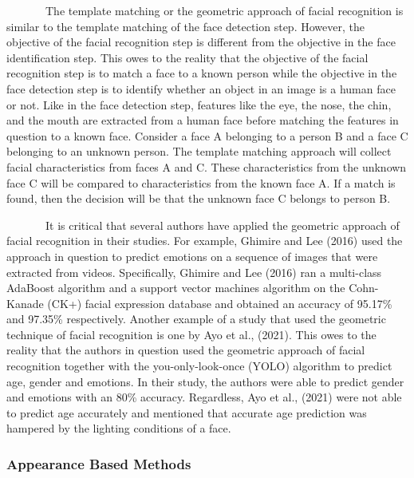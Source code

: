 \documentclass[
  12pt,
]{report}
\begin{document}
~~~~~~~The template matching or the geometric approach of facial
recognition is similar to the template matching of the face detection
step. However, the objective of the facial recognition step is different
from the objective in the face identification step. This owes to the
reality that the objective of the facial recognition step is to match a
face to a known person while the objective in the face detection step is
to identify whether an object in an image is a human face or not. Like
in the face detection step, features like the eye, the nose, the chin,
and the mouth are extracted from a human face before matching the
features in question to a known face. Consider a face A belonging to a
person B and a face C belonging to an unknown person. The template
matching approach will collect facial characteristics from faces A and
C. These characteristics from the unknown face C will be compared to
characteristics from the known face A. If a match is found, then the
decision will be that the unknown face C belongs to person B.

~~~~~~~It is critical that several authors have applied the geometric
approach of facial recognition in their studies. For example, Ghimire
and Lee (2016) used the approach in question to predict emotions on a
sequence of images that were extracted from videos. Specifically,
Ghimire and Lee (2016) ran a multi-class AdaBoost algorithm and a
support vector machines algorithm on the Cohn-Kanade (CK+) facial
expression database and obtained an accuracy of 95.17\% and 97.35\%
respectively. Another example of a study that used the geometric
technique of facial recognition is one by Ayo et al., (2021). This owes
to the reality that the authors in question used the geometric approach
of facial recognition together with the you-only-look-once (YOLO)
algorithm to predict age, gender and emotions. In their study, the
authors were able to predict gender and emotions with an 80\% accuracy.
Regardless, Ayo et al., (2021) were not able to predict age accurately
and mentioned that accurate age prediction was hampered by the lighting
conditions of a face.

\subsubsection{\texorpdfstring{Appearance Based Methods\\
}{Appearance Based Methods }}\label{appearance-based-methods}
\end{document}
